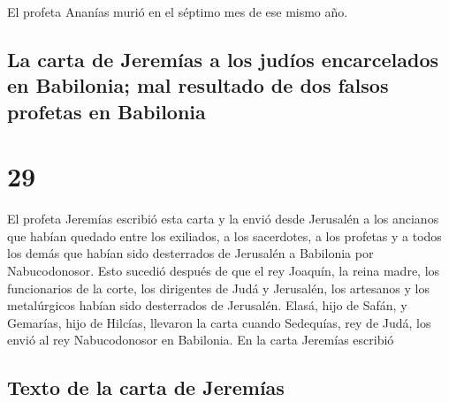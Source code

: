  El profeta Ananías murió en el séptimo mes de ese mismo
año.

\hypertarget{la-carta-de-jeremuxedas-a-los-juduxedos-encarcelados-en-babilonia-mal-resultado-de-dos-falsos-profetas-en-babilonia}{%
\subsection{La carta de Jeremías a los judíos encarcelados en Babilonia;
mal resultado de dos falsos profetas en
Babilonia}\label{la-carta-de-jeremuxedas-a-los-juduxedos-encarcelados-en-babilonia-mal-resultado-de-dos-falsos-profetas-en-babilonia}}

\hypertarget{section-28}{%
\section{29}\label{section-28}}

 El profeta Jeremías escribió esta carta y la envió desde
Jerusalén a los ancianos que habían quedado entre los exiliados, a los
sacerdotes, a los profetas y a todos los demás que habían sido
desterrados de Jerusalén a Babilonia por Nabucodonosor. 
Esto sucedió después de que el rey Joaquín, la reina madre, los
funcionarios de la corte, los dirigentes de Judá y Jerusalén, los
artesanos y los metalúrgicos habían sido desterrados de Jerusalén.
 Elasá, hijo de Safán, y Gemarías, hijo de Hilcías,
llevaron la carta cuando Sedequías, rey de Judá, los envió al rey
Nabucodonosor en Babilonia. En la carta Jeremías escribió

\hypertarget{texto-de-la-carta-de-jeremuxedas}{%
\subsection{Texto de la carta de
Jeremías}\label{texto-de-la-carta-de-jeremuxedas}}

